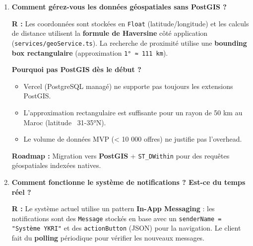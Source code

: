 \documentclass[12pt, a4paper]{article}
\begin{document}
\begin{enumerate}[leftmargin=2em, label=\textbf{Q\arabic*.}]
Ce choix est justifié par :
\begin{itemize}
  \item \textbf{Complexité limitée} : L'état global se résume à l'utilisateur authentifié et la langue. Les données métier (offres, demandes) sont fetchées à la demande via \texttt{apiService.ts}.
  \item \textbf{Absence de cross-cutting state} : Pas de panier, pas de workflow multi-étapes nécessitant un store global.
  \item \textbf{Overhead réduit} : Redux/Zustand ajouteraient de la complexité sans bénéfice pour la taille actuelle.
\end{itemize}
\textbf{Roadmap :} Adoption de \textbf{TanStack Query (React Query)} pour le cache serveur, la synchronisation temps réel, et la pagination infinie du feed.

\vspace{0.5em}

\item \textbf{Comment gérez-vous les données géospatiales sans PostGIS ?}

\textbf{R :} Les coordonnées sont stockées en \texttt{Float} (latitude/longitude) et les calculs de distance utilisent la \textbf{formule de Haversine} côté application (\texttt{services/geoService.ts}). La recherche de proximité utilise une \textbf{bounding box rectangulaire} (approximation \texttt{1° ≈ 111 km}).

\textbf{Pourquoi pas PostGIS dès le début ?}
\begin{itemize}
  \item Vercel (PostgreSQL managé) ne supporte pas toujours les extensions PostGIS.
  \item L'approximation rectangulaire est suffisante pour un rayon de 50 km au Maroc (latitude ~31-35°N).
  \item Le volume de données MVP (< 10 000 offres) ne justifie pas l'overhead.
\end{itemize}
\textbf{Roadmap :} Migration vers \textbf{PostGIS} + \texttt{ST\_DWithin} pour des requêtes géospatiales indexées natives.

\vspace{0.5em}

\item \textbf{Comment fonctionne le système de notifications ? Est-ce du temps réel ?}

\textbf{R :} Le système actuel utilise un pattern \textbf{In-App Messaging} : les notifications sont des \texttt{Message} stockés en base avec un \texttt{senderName = "Système YKRI"} et des \texttt{actionButton} (JSON) pour la navigation. Le client fait du \textbf{polling} périodique pour vérifier les nouveaux messages.


\end{enumerate}
\end{document}
